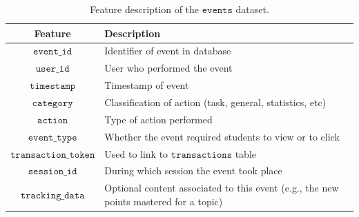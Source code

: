 \documentclass[sigplan,screen]{acmart}
\begin{document}
\begin{table}[!ht]
  \caption{Feature description of the $\texttt{events}$ dataset.}
  \label{tab:events}
  \begin{tabular}{cl}
    \toprule
    \textbf{Feature}&\textbf{Description}\\
    \midrule
    $\texttt{event\_id}$ & Identifier of event in database \\
    $\texttt{user\_id}$ & User who performed the event \\
    $\texttt{timestamp}$ & Timestamp of event \\
    $\texttt{category}$ & Classification of action (task, general, statistics, etc) \\
    $\texttt{action}$ & Type of action performed \\
    $\texttt{event\_type}$ & Whether the event required students to view or to click \\
    $\texttt{transaction\_token}$ & Used to link to $\texttt{transactions}$ table \\
    $\texttt{session\_id}$ & During which session the event took place \\
    $\texttt{tracking\_data}$ & Optional content associated to this event (e.g., the new points mastered for a topic) \\
    \bottomrule
    \end{tabular}
\end{table}
\end{document}

